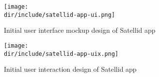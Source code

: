 \begin{figure}[htb]
  \centering
  \texttt{[image: \\dir/include/satellid-app-ui.png]}
  \caption{Initial user interface mockup design of Satellid app}
  \label{fig:satellid-app-ui}
\end{figure}

\begin{figure}[htb]
  \centering
  \texttt{[image: \\dir/include/satellid-app-uix.png]}
  \caption{Initial user interaction design of Satellid app}
  \label{fig:satellid-app-uix}
\end{figure}
